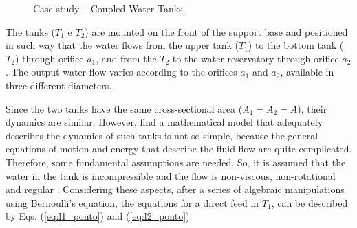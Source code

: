 \documentclass[10pt,fleqn,a4paper]{article}
\begin{document}
\begin{figure}[htb]
\centering
{}
\qquad
{}
    \caption{Case study -- Coupled Water Tanks.}
\end{figure}

The tanks ($T_1$ e $T_2$) are mounted on the front of the support base and
positioned in such way that the water flows from the upper tank ($T_1$) to the
bottom tank ($T_2$) through orifice $a_1$, and from the $T_2$ to the water
reservatory through orifice $a_2$. The output water flow varies according to the
orifices $a_1$ and $a_2$, available in three different diameters.

Since the two tanks have the same cross-sectional area ($A_1 = A_2 = A$), their
dynamics are similar. However, find a mathematical model that adequately
describes the dynamics of such tanks is not so simple, because the general
equations of motion and energy that describe the fluid flow are quite
complicated. Therefore, some fundamental assumptions are needed. So, it is
assumed that the water in the tank is incompressible and the flow is
non-viscous, non-rotational and regular \citep{dorf:2009}. Considering these
aspects, after a series of algebraic manipulations using Bernoulli's equation,
the equations for a direct feed in $T_1$, can be described by Eqs.
(\ref{eq:l1_ponto}) and (\ref{eq:l2_ponto}).
\end{document}
